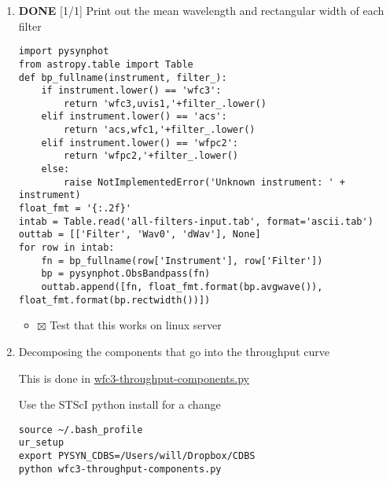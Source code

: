 \documentclass[11pt]{article}
\begin{document}
\begin{enumerate}
\item {\bfseries\sffamily DONE} [1/1] Print out the mean wavelength and rectangular width of each filter
\label{sec:orgheadline17}
\begin{verbatim}
import pysynphot
from astropy.table import Table
def bp_fullname(instrument, filter_):
    if instrument.lower() == 'wfc3':
        return 'wfc3,uvis1,'+filter_.lower()
    elif instrument.lower() == 'acs':
        return 'acs,wfc1,'+filter_.lower()
    elif instrument.lower() == 'wfpc2':
        return 'wfpc2,'+filter_.lower()
    else:
        raise NotImplementedError('Unknown instrument: ' + instrument)
float_fmt = '{:.2f}'
intab = Table.read('all-filters-input.tab', format='ascii.tab')
outtab = [['Filter', 'Wav0', 'dWav'], None]
for row in intab:
    fn = bp_fullname(row['Instrument'], row['Filter'])
    bp = pysynphot.ObsBandpass(fn)
    outtab.append([fn, float_fmt.format(bp.avgwave()), float_fmt.format(bp.rectwidth())])
\end{verbatim}

\begin{itemize}
\item $\boxtimes$ Test that this works on linux server
\end{itemize}



\item Decomposing the components that go into the throughput curve
\label{sec:orgheadline19}

This is done in \url{wfc3-throughput-components.py}

Use the STScI python install for a change
\begin{verbatim}
source ~/.bash_profile
ur_setup
export PYSYN_CDBS=/Users/will/Dropbox/CDBS
python wfc3-throughput-components.py
\end{verbatim}


\end{enumerate}
\end{document}
